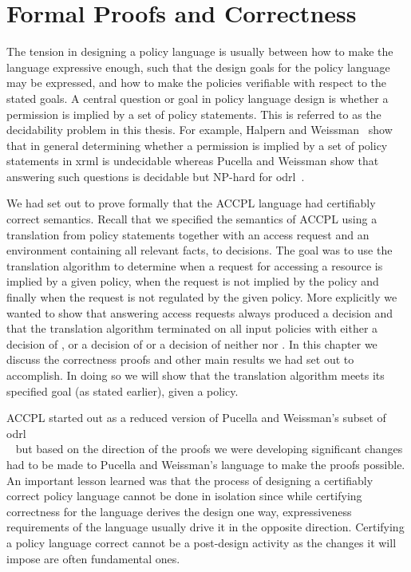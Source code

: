 \chapter{Formal Proofs and Correctness}\label{chap:results}

                  
The tension in designing a policy language is usually between how to make the language expressive enough, such that the design goals for the policy language may be expressed, and how to make the policies verifiable with respect to the stated goals. A central question or goal in policy language design is whether a permission is implied by a set of policy statements. This is referred to as the decidability problem in this thesis. For example, Halpern and Weissman~\cite{HalpernW08} show that in general determining whether a permission is implied by a set of policy statements in \ac{xrml} is undecidable whereas Pucella and Weissman show that answering such questions is decidable but NP-hard for \ac{odrl}~\cite{pucella2006}.
 

We had set out to prove formally that the \ac{ACCPL} language had certifiably correct semantics. Recall that we specified the semantics of \ac{ACCPL} using a translation from policy statements together with an access request and an environment containing all relevant facts, to decisions. The goal was to use the translation algorithm to determine when a request for accessing a resource is implied by a given policy, when the request is not implied by the policy and finally when the request is not regulated by the given policy. More explicitly we wanted to show that answering access requests always produced a decision and that the translation algorithm terminated on all input policies with either a decision of , or a decision of or a decision of neither  nor . In this chapter we discuss the correctness proofs and other main results we had set out to accomplish. In doing so we will show that the translation algorithm meets its specified goal (as stated earlier), given a policy. 


\ac{ACCPL} started out as a reduced version of Pucella and Weissman's subset of \ac{odrl}\\~\cite{pucella2006} but based on the direction of the proofs we were developing significant changes had to be made to Pucella and Weissman's language to make the proofs possible. An important lesson learned was that the process of designing a certifiably correct policy language cannot be done in isolation since while certifying correctness for the language derives the design one way, expressiveness requirements of the language usually drive it in the opposite direction. Certifying a policy language correct cannot be a post-design activity as the changes it will impose are often fundamental ones.

